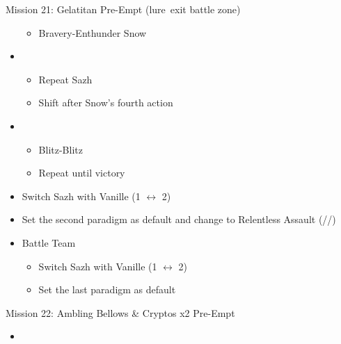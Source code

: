 \begin{paracol}{2}
\begin{battle}{Mission 21: Gelatitan Pre-Empt (lure\, exit battle zone)}
\begin{itemize}
\begin{itemize}
				      \item Bravery-Enthunder Snow
			      \end{itemize}
			\item \fifth
			      \begin{itemize}
				      \item Repeat Sazh
				      \item Shift after Snow's fourth action
			      \end{itemize}
			\item \sixth
			      \begin{itemize}
				      \item Blitz-Blitz
				      \item Repeat until victory
			      \end{itemize}
		\end{itemize}
	\end{battle}
	\switchcolumn*
	\begin{menu}
		\begin{itemize}
			\paradigm
			\begin{itemize}
				\item Switch Sazh with Vanille (1 $\leftrightarrow$ 2)
				\item Set the second paradigm as default and change to Relentless Assault (\rav/\com/\rav)
			\end{itemize}
		\end{itemize}
	\end{menu}
	\switchcolumn
	\begin{menu}
		\begin{itemize}
			\paradigm
			\begin{itemize}
				\item Battle Team
				      \begin{itemize}
					      \item Switch Sazh with Vanille (1 $\leftrightarrow$ 2)
					      \item Set the last paradigm as default
				      \end{itemize}
			\end{itemize}
		\end{itemize}
	\end{menu}
	\switchcolumn*
	\renewcommand{\second}{[2]Relentless Assault (\rav/\com/\rav)}
	\begin{battle}{Mission 22: Ambling Bellows \& Cryptos x2 Pre-Empt}
		\begin{itemize}
			\item \second

\end{itemize}
\end{battle}
\end{paracol}

